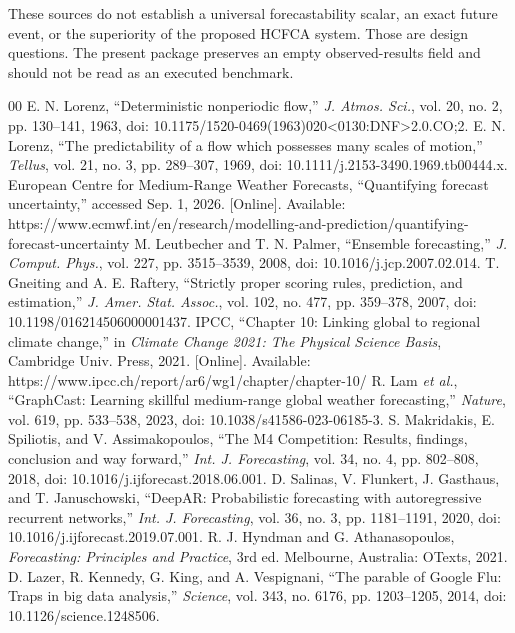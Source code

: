 \documentclass[conference]{IEEEtran}
\begin{document}
These sources do not establish a universal forecastability scalar, an exact future event, or the superiority of the proposed HCFCA system. Those are design questions. The present package preserves an empty observed-results field and should not be read as an executed benchmark.

\begin{thebibliography}{00}
 E. N. Lorenz, ``Deterministic nonperiodic flow,'' \emph{J. Atmos. Sci.}, vol. 20, no. 2, pp. 130--141, 1963, doi: 10.1175/1520-0469(1963)020<0130:DNF>2.0.CO;2.
 E. N. Lorenz, ``The predictability of a flow which possesses many scales of motion,'' \emph{Tellus}, vol. 21, no. 3, pp. 289--307, 1969, doi: 10.1111/j.2153-3490.1969.tb00444.x.
 European Centre for Medium-Range Weather Forecasts, ``Quantifying forecast uncertainty,'' accessed Sep. 1, 2026. [Online]. Available: https://www.ecmwf.int/en/research/modelling-and-prediction/quantifying-forecast-uncertainty
 M. Leutbecher and T. N. Palmer, ``Ensemble forecasting,'' \emph{J. Comput. Phys.}, vol. 227, pp. 3515--3539, 2008, doi: 10.1016/j.jcp.2007.02.014.
 T. Gneiting and A. E. Raftery, ``Strictly proper scoring rules, prediction, and estimation,'' \emph{J. Amer. Stat. Assoc.}, vol. 102, no. 477, pp. 359--378, 2007, doi: 10.1198/016214506000001437.
 IPCC, ``Chapter 10: Linking global to regional climate change,'' in \emph{Climate Change 2021: The Physical Science Basis}, Cambridge Univ. Press, 2021. [Online]. Available: https://www.ipcc.ch/report/ar6/wg1/chapter/chapter-10/
 R. Lam \emph{et al.}, ``GraphCast: Learning skillful medium-range global weather forecasting,'' \emph{Nature}, vol. 619, pp. 533--538, 2023, doi: 10.1038/s41586-023-06185-3.
 S. Makridakis, E. Spiliotis, and V. Assimakopoulos, ``The M4 Competition: Results, findings, conclusion and way forward,'' \emph{Int. J. Forecasting}, vol. 34, no. 4, pp. 802--808, 2018, doi: 10.1016/j.ijforecast.2018.06.001.
 D. Salinas, V. Flunkert, J. Gasthaus, and T. Januschowski, ``DeepAR: Probabilistic forecasting with autoregressive recurrent networks,'' \emph{Int. J. Forecasting}, vol. 36, no. 3, pp. 1181--1191, 2020, doi: 10.1016/j.ijforecast.2019.07.001.
 R. J. Hyndman and G. Athanasopoulos, \emph{Forecasting: Principles and Practice}, 3rd ed. Melbourne, Australia: OTexts, 2021.
 D. Lazer, R. Kennedy, G. King, and A. Vespignani, ``The parable of Google Flu: Traps in big data analysis,'' \emph{Science}, vol. 343, no. 6176, pp. 1203--1205, 2014, doi: 10.1126/science.1248506.
\end{thebibliography}
\end{document}
